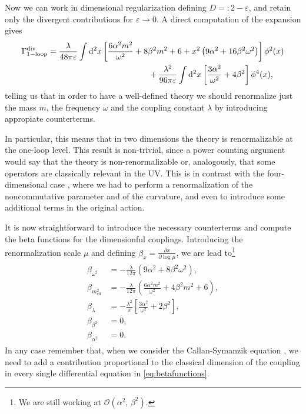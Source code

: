 \documentclass[a4paper,10pt]{amsart}
\newcommand{\nocol}[1]{{#1}}
\begin{document}
Now we can work in dimensional regularization defining $D=:2-\varepsilon$, and retain only the divergent contributions for $\varepsilon\rightarrow 0$.
A direct computation of the expansion gives
\begin{align}
\begin{split}
\Gamma_{1-\text{loop}}^{\text{div}}=\frac{\lambda}{48\pi \varepsilon }&\int {\rm d}^2x \left [
\frac{6 \alpha ^2 m^2}{\omega ^2}+8 \beta ^2 m^2+6+x^2 \left(9 \alpha ^2+16 \beta ^2 \omega ^2\right)
\right] \phi^2(x)
\\
&\hspace{3cm}+\frac{\lambda^2}{96\pi\varepsilon}\int {\rm d}^2x \left[ \frac{3 \alpha ^2}{\omega ^2}+4 \beta ^2 \right] \phi^4(x),
\end{split}
\end{align}
telling us that in order to have a well-defined theory we should renormalize just the mass $m$, the frequency $\omega$ and the coupling constant $\lambda$
by introducing appropiate counterterms.

In particular, this means that in two dimensions the theory is renormalizable  at the one-loop level.
\nocol{This result is non-trivial, since a power counting argument would say that the theory is non-renormalizable
or, analogously, that some operators are classically relevant in the UV}.
This is in contrast with the four-dimensional case \cite{Franchino-Vinas:2019nqy},
where we had to perform a renormalization of the noncommutative parameter and of the curvature,
and even to introduce some additional terms in the original action.


It is now straightforward to introduce the necessary counterterms and compute the beta functions
for the dimensionful couplings.
Introducing the renormalization scale $\mu$ and defining $\beta_{x}=\frac{\partial x}{\partial \log \mu}$,
we are lead to\footnote{\nocol{We are still working at $\mathcal{O}(\alpha^2,\,\beta^2)$.} }
\begin{align}
\begin{split}\label{eq:betafunctions}
 \beta_{\omega^2}
 &=-\frac{\lambda}{12\pi } \left(9 \alpha ^2+8 \beta ^2 \omega ^2\right),\\
 \beta_{ m^2_{\text{eff}}}
 &=-\frac{\lambda}{12\pi }  \left( \frac{6 \alpha ^2  m^2}{\omega ^2}+4 \beta ^2  m^2+6\right),\\
 \beta_{\lambda}
 &=- \frac{\lambda^2  }{\pi}\left[ \frac{3 \alpha ^2}{\omega ^2}+2 \beta ^2 \right],
 \\
 \beta_{\beta^2}
 &=0,
 \\
 \beta_{\alpha^2}
 &= 0.
 \end{split}
\end{align}
In any case remember that, when we consider the Callan-Symanzik equation \cite{peshkin}, we need to add a contribution proportional to the classical dimension
of the coupling in every single differential equation in \eqref{eq:betafunctions}.
\end{document}
